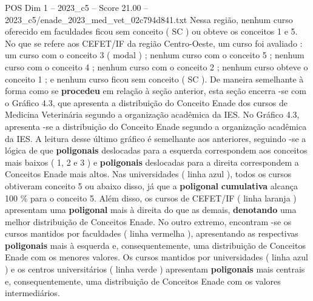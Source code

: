 \begin{textsample}{POS Dim 1 – 2023\_c5 – Score 21.00 – 2023\_c5/enade\_2023\_med\_vet\_02c794d841.txt}
Nessa região, nenhum curso oferecido em faculdades ficou sem conceito ( SC ) ou obteve os conceitos 1 e 5.
No que se refere aos CEFET/IF da região Centro-Oeste, um curso foi avaliado : um curso com o conceito 3 ( modal ) ; nenhum curso com o conceito 5 ; nenhum curso com o conceito 4 ; nenhum curso com o conceito 2 ; nenhum curso obteve o conceito 1 ; e nenhum curso ficou sem conceito ( SC ).
De maneira semelhante à forma como se \textbf{procedeu} em relação à seção anterior, esta seção encerra -se com o Gráfico 4.3, que apresenta a distribuição do Conceito Enade dos cursos de Medicina Veterinária segundo a organização acadêmica da IES.
No Gráfico 4.3, apresenta -se a distribuição do Conceito Enade segundo a organização acadêmica da IES.
A leitura desse último gráfico é semelhante aos anteriores, seguindo -se a lógica de que \textbf{poligonais} deslocadas para a esquerda correspondem aos conceitos mais baixos ( 1, 2 e 3 ) e \textbf{poligonais} deslocadas para a direita correspondem a Conceitos Enade mais altos.
Nas universidades ( linha azul ), todos os cursos obtiveram conceito 5 ou abaixo disso, já que a \textbf{poligonal} \textbf{cumulativa} alcança 100 \% para o conceito 5.
Além disso, os cursos de CEFET/IF ( linha laranja ) apresentam uma \textbf{poligonal} mais à direita do que as demais, \textbf{denotando} uma melhor distribuição de Conceitos Enade.
No outro extremo, encontram -se os cursos mantidos por faculdades ( linha vermelha ), apresentando as respectivas \textbf{poligonais} mais à esquerda e, consequentemente, uma distribuição de Conceitos Enade com os menores valores.
Os cursos mantidos por universidades ( linha azul ) e os centros universitários ( linha verde ) apresentam \textbf{poligonais} mais centrais e, consequentemente, uma distribuição de Conceitos Enade com os valores intermediários.

\end{textsample}

